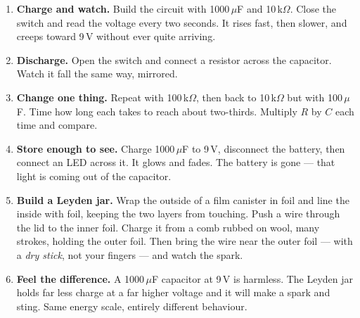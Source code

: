 \begin{enumerate}
\item \textbf{Charge and watch.} Build the circuit with 1000\,$\mu$F and
  10\,k$\Omega$. Close the switch and read the voltage every two seconds. It
  rises fast, then slower, and creeps toward 9\,V without ever quite arriving.
\item \textbf{Discharge.} Open the switch and connect a resistor across the
  capacitor. Watch it fall the same way, mirrored.
\item \textbf{Change one thing.} Repeat with 100\,k$\Omega$, then back to
  10\,k$\Omega$ but with 100\,$\mu$F. Time how long each takes to reach about
  two-thirds. Multiply $R$ by $C$ each time and compare.
\item \textbf{Store enough to see.} Charge 1000\,$\mu$F to 9\,V, disconnect the
  battery, then connect an LED across it. It glows and fades. The battery is
  gone --- that light is coming out of the capacitor.
\item \textbf{Build a Leyden jar.} Wrap the outside of a film canister in foil
  and line the inside with foil, keeping the two layers from touching. Push a
  wire through the lid to the inner foil. Charge it from a comb rubbed on wool,
  many strokes, holding the outer foil. Then bring the wire near the outer foil
  --- with a \emph{dry stick}, not your fingers --- and watch the spark.
\item \textbf{Feel the difference.} A 1000\,$\mu$F capacitor at 9\,V is
  harmless. The Leyden jar holds far less charge at a far higher voltage and it
  will make a spark and sting. Same energy scale, entirely different behaviour.
\end{enumerate}

\begin{telosfacts}[0.20]
\end{telosfacts}

